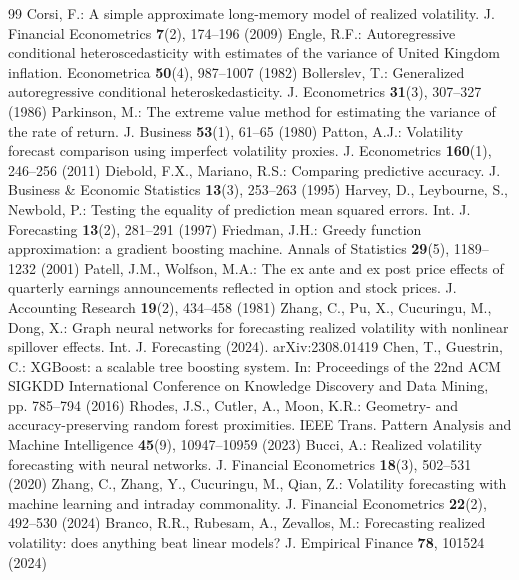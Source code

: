 \documentclass[runningheads]{llncs}
\begin{document}
\begin{thebibliography}{99}
 Corsi, F.: A simple approximate long-memory model of realized volatility. J. Financial Econometrics \textbf{7}(2), 174--196 (2009)
 Engle, R.F.: Autoregressive conditional heteroscedasticity with estimates of the variance of United Kingdom inflation. Econometrica \textbf{50}(4), 987--1007 (1982)
 Bollerslev, T.: Generalized autoregressive conditional heteroskedasticity. J. Econometrics \textbf{31}(3), 307--327 (1986)
 Parkinson, M.: The extreme value method for estimating the variance of the rate of return. J. Business \textbf{53}(1), 61--65 (1980)
 Patton, A.J.: Volatility forecast comparison using imperfect volatility proxies. J. Econometrics \textbf{160}(1), 246--256 (2011)
 Diebold, F.X., Mariano, R.S.: Comparing predictive accuracy. J. Business \& Economic Statistics \textbf{13}(3), 253--263 (1995)
 Harvey, D., Leybourne, S., Newbold, P.: Testing the equality of prediction mean squared errors. Int. J. Forecasting \textbf{13}(2), 281--291 (1997)
 Friedman, J.H.: Greedy function approximation: a gradient boosting machine. Annals of Statistics \textbf{29}(5), 1189--1232 (2001)
 Patell, J.M., Wolfson, M.A.: The ex ante and ex post price effects of quarterly earnings announcements reflected in option and stock prices. J. Accounting Research \textbf{19}(2), 434--458 (1981)
 Zhang, C., Pu, X., Cucuringu, M., Dong, X.: Graph neural networks for forecasting realized volatility with nonlinear spillover effects. Int. J. Forecasting (2024). arXiv:2308.01419
 Chen, T., Guestrin, C.: XGBoost: a scalable tree boosting system. In: Proceedings of the 22nd ACM SIGKDD International Conference on Knowledge Discovery and Data Mining, pp. 785--794 (2016)
 Rhodes, J.S., Cutler, A., Moon, K.R.: Geometry- and accuracy-preserving random forest proximities. IEEE Trans. Pattern Analysis and Machine Intelligence \textbf{45}(9), 10947--10959 (2023)
 Bucci, A.: Realized volatility forecasting with neural networks. J. Financial Econometrics \textbf{18}(3), 502--531 (2020)
 Zhang, C., Zhang, Y., Cucuringu, M., Qian, Z.: Volatility forecasting with machine learning and intraday commonality. J. Financial Econometrics \textbf{22}(2), 492--530 (2024)
 Branco, R.R., Rubesam, A., Zevallos, M.: Forecasting realized volatility: does anything beat linear models? J. Empirical Finance \textbf{78}, 101524 (2024)

\end{thebibliography}
\end{document}

